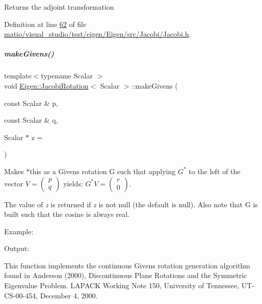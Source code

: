 Returns the adjoint transformation 

Definition at line \hyperlink{matio_2visual__studio_2test_2eigen_2_eigen_2src_2_jacobi_2_jacobi_8h_source_l00062}{62} of file \hyperlink{matio_2visual__studio_2test_2eigen_2_eigen_2src_2_jacobi_2_jacobi_8h_source}{matio/visual\+\_\+studio/test/eigen/\+Eigen/src/\+Jacobi/\+Jacobi.\+h}.

\mbox{\label{group___jacobi___module_af73c81e9cc139b7e0d877ce553b02ec0}} 
\subparagraph{\texorpdfstring{make\+Givens()}{makeGivens()}}
{\footnotesize\ttfamily template$<$typename Scalar $>$ \\
void \hyperlink{group___jacobi___module_class_eigen_1_1_jacobi_rotation}{Eigen\+::\+Jacobi\+Rotation}$<$ Scalar $>$\+::make\+Givens (\begin{DoxyParamCaption}\item[{const Scalar \&}]{p,  }\item[{const Scalar \&}]{q,  }\item[{Scalar $\ast$}]{z = {} }\end{DoxyParamCaption})}

Makes {\ttfamily $\ast$this} as a Givens rotation {\ttfamily G} such that applying $ G^* $ to the left of the vector $ V = \left ( \begin{array}{c} p \\ q \end{array} \right )$ yields\+: $ G^* V = \left ( \begin{array}{c} r \\ 0 \end{array} \right )$.

The value of {\itshape z} is returned if {\itshape z} is not null (the default is null). Also note that G is built such that the cosine is always real.

Example\+: 
\begin{DoxyCodeInclude}
\end{DoxyCodeInclude}
 Output\+: 
\begin{DoxyVerbInclude}
\end{DoxyVerbInclude}


This function implements the continuous Givens rotation generation algorithm found in Anderson (2000), Discontinuous Plane Rotations and the Symmetric Eigenvalue Problem. L\+A\+P\+A\+CK Working Note 150, University of Tennessee, U\+T-\/\+C\+S-\/00-\/454, December 4, 2000.

